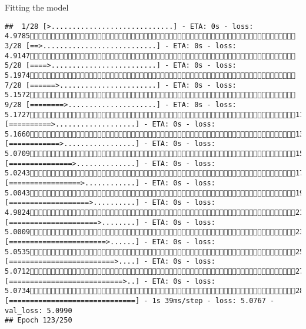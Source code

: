 \documentclass[
  ignorenonframetext,
]{beamer}
\begin{document}
\begin{frame}[fragile]{Fitting the model}
\begin{verbatim}
##  1/28 [>.............................] - ETA: 0s - loss: 4.9785 3/28 [==>...........................] - ETA: 0s - loss: 4.9147 5/28 [====>.........................] - ETA: 0s - loss: 5.1974 7/28 [======>.......................] - ETA: 0s - loss: 5.1572 9/28 [========>.....................] - ETA: 0s - loss: 5.172711/28 [==========>...................] - ETA: 0s - loss: 5.166013/28 [============>.................] - ETA: 0s - loss: 5.070915/28 [===============>..............] - ETA: 0s - loss: 5.024317/28 [=================>............] - ETA: 0s - loss: 5.004319/28 [===================>..........] - ETA: 0s - loss: 4.982421/28 [=====================>........] - ETA: 0s - loss: 5.000923/28 [=======================>......] - ETA: 0s - loss: 5.053525/28 [=========================>....] - ETA: 0s - loss: 5.071227/28 [===========================>..] - ETA: 0s - loss: 5.073428/28 [==============================] - 1s 39ms/step - loss: 5.0767 - val_loss: 5.0990
## Epoch 123/250

\end{verbatim}
\end{frame}
\end{document}
